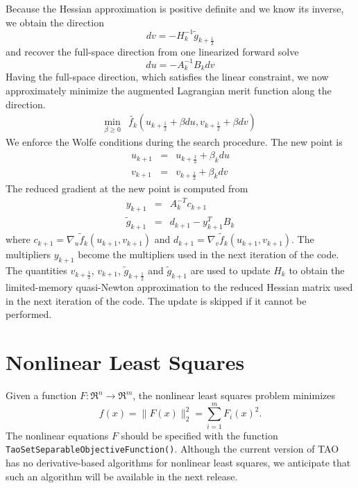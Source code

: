 Because the Hessian approximation is positive definite and we know its
inverse, we obtain the direction
\[
  dv = -H_k^{-1} \tilde{g}_{k+\frac{1}{2}}
\]
and recover the full-space direction from one linearized forward solve
\[
  du = -A_k^{-1} B_k dv
\]
Having the full-space direction, which satisfies the linear constraint, 
we now approximately minimize the augmented Lagrangian merit function 
along the direction.
\[
\begin{array}{lcl}
\displaystyle \min_{\beta \geq 0} & \tilde{f_k}(u_{k+\frac{1}{2}} + \beta du, v_{k+\frac{1}{2}} + \beta dv)
\end{array}
\]
We enforce the Wolfe conditions during the search procedure.  The new point
is
\[
\begin{array}{lcl}
u_{k+1} & = & u_{k+\frac{1}{2}} + \beta_k du \\
v_{k+1} & = & v_{k+\frac{1}{2}} + \beta_k dv
\end{array}
\]
The reduced gradient at the new point is computed from
\[
\begin{array}{lcl}
y_{k+1} & = & A_k^{-T}c_{k+1} \\
\tilde{g}_{k+1} & = & d_{k+1} - y_{k+1}^T B_k
\end{array}
\]
where $c_{k+1} = \nabla_u \tilde{f}_k (u_{k+1},v_{k+1})$ and
$d_{k+1} = \nabla_v \tilde{f}_k (u_{k+1},v_{k+1})$.  The
multipliers $y_{k+1}$ become the multipliers used in the
next iteration of the code.  The quantities $v_{k+\frac{1}{2}}$,
$v_{k+1}$, $\tilde{g}_{k+\frac{1}{2}}$ and $\tilde{g}_{k+1}$ are
used to update $H_k$ to obtain the limited-memory quasi-Newton
approximation to the reduced Hessian matrix used in the next
iteration of the code.  The update is skipped if it cannot be
performed.

\section{Nonlinear Least Squares}
\label{sec:leastsquares}
Given a function $F: \Re^n \to \Re^m$, the nonlinear least
squares problem minimizes 
\begin{equation} 
 f(x)= \| F(x) \|_2^2 = \sum_{i=1}^m F_i(x)^2.
 \label{eq:nlsf}
\end{equation}
The nonlinear equations $F$ should be specified with the function
{\tt Tao\-Set\-Separ\-able\-Objective\-Function()}.
Although the current version of TAO has no derivative-based algorithms 
for nonlinear least squares, we anticipate that such an algorithm will 
be available in the next release. 

